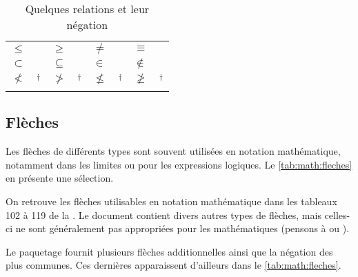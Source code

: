 \begin{table}[p]
  \caption{Quelques relations et leur négation}
  \label{tab:math:relations}
  \begin{tabularx}{1.0\linewidth}{lXlXlXlX}
    $\leq$      & \cmd{\leq} &
    $\geq$      & \cmd{\geq}   &
    $\neq$      & \cmd{\neq}    &
    $\equiv$    & \cmd{\equiv}    \\
    $\subset$   & \cmd{\subset} &
    $\subseteq$ & \cmd{\subseteq}  &
    $\in$       & \cmd{\in} &
    $\notin$    & \cmd{\notin} \\
    $\nless$    & \cmd{\nless}$^\dagger$ &
    $\ngtr$     & \cmd{\ngtr}$^\dagger$   &
    $\nleq$     & \cmd{\nleq}$^\dagger$    &
    $\ngeq$     & \cmd{\ngeq}$^\dagger$ \\
    \addlinespace
  \end{tabularx}
\end{table}

\subsection{Flèches}
\label{sec:math:symboles:fleches}

Les flèches de différents types sont souvent utilisées en notation
mathématique, notamment dans les limites ou pour les expressions
logiques. Le \autoref{tab:math:fleches} en présente une sélection.

On retrouve les flèches utilisables en notation mathématique dans les
tableaux 102 à 119 de la %
. %
Le document contient divers autres types de flèches, mais celles-ci ne
sont généralement pas appropriées pour les mathématiques (pensons à
{\manerrarrow} ou {\faArrowRight}).

Le paquetage  fournit plusieurs flèches additionnelles
ainsi que la négation des plus communes. Ces dernières apparaissent
d'ailleurs dans le \autoref{tab:math:fleches}.

